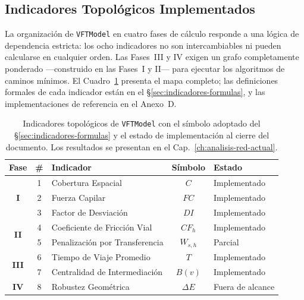 
\subsection{Indicadores Topológicos Implementados}
\label{sec:vft-indicadores}

La organización de \texttt{VFTModel} en cuatro fases de cálculo responde a una lógica de
dependencia estricta: los ocho indicadores no son intercambiables ni pueden
calcularse en cualquier orden. Las Fases~III y IV exigen un grafo completamente
ponderado —construido en las Fases~I y II— para ejecutar los algoritmos de
caminos mínimos. El Cuadro~\ref{tab:vft-indicadores-estado} presenta el mapa
completo; las definiciones formales de cada indicador están en el
§\ref{sec:indicadores-formulas}, y las implementaciones de referencia en el
Anexo~D.

\begin{table}[H]
    \centering
    \caption[Indicadores topológicos de \texttt{VFTModel} y estado de implementación]{
    Indicadores topológicos de \texttt{VFTModel} con el símbolo adoptado del
    §\ref{sec:indicadores-formulas} y el estado de implementación al cierre
    del documento. Los resultados se presentan en el
    Cap.~\ref{ch:analisis-red-actual}.}
    \label{tab:vft-indicadores-estado}
    \begin{tabularx}{\textwidth}{|c|c|X|c|l|}
        \hline
        \textbf{Fase} & \textbf{\#} & \textbf{Indicador} &
        \textbf{Símbolo} & \textbf{Estado} \\
        \hline
        \multirow{3}{*}{\textbf{I}}
          & 1 & Cobertura Espacial             & $C$        & Implementado \\
          & 2 & Fuerza Capilar                 & $FC$       & Implementado \\
          & 3 & Factor de Desviación           & $DI$       & Implementado \\
        \hline
        \multirow{2}{*}{\textbf{II}}
          & 4 & Coeficiente de Fricción Vial   & $CF_h$     & Implementado \\
          & 5 & Penalización por Transferencia & $W_{s,h}$  & Parcial      \\
        \hline
        \multirow{2}{*}{\textbf{III}}
          & 6 & Tiempo de Viaje Promedio       & $T$        & Implementado \\
          & 7 & Centralidad de Intermediación  & $B(v)$     & Implementado \\
        \hline
        \textbf{IV}
          & 8 & Robustez Geométrica            & $\Delta E$ & Fuera de alcance \\
        \hline
    \end{tabularx}
\end{table}

